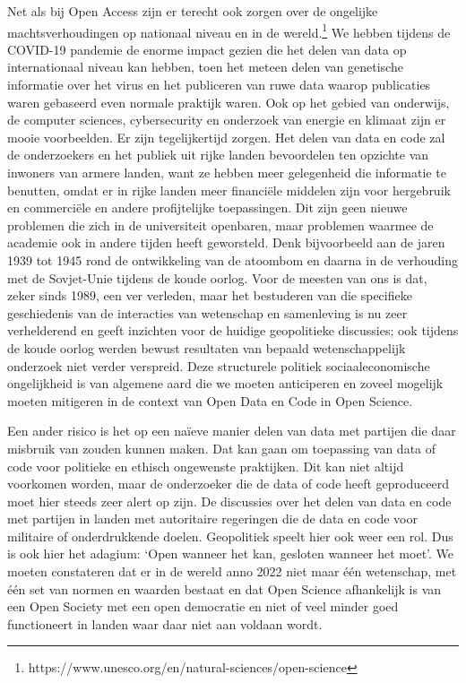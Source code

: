 \documentclass{jote-book}
\begin{document}
	Net als bij Open Access zijn er terecht ook zorgen over de ongelijke machtsverhoudingen op nationaal niveau en in de wereld.\footnote{https://www.unesco.org/en/natural-sciences/open-science} We hebben tijdens de COVID-19 pandemie de enorme impact gezien die het delen van data op internationaal niveau kan hebben, toen het meteen delen van genetische informatie over het virus en het publiceren van ruwe data waarop publicaties waren gebaseerd even normale praktijk waren. Ook op het gebied van onderwijs, de computer sciences, cybersecurity en onderzoek van energie en klimaat zijn er mooie voorbeelden. Er zijn tegelijkertijd zorgen. Het delen van data en code zal de onderzoekers en het publiek uit rijke landen bevoordelen ten opzichte van inwoners van armere landen, want ze hebben meer gelegenheid die informatie te benutten, omdat er in rijke landen meer financiële middelen zijn voor hergebruik en commerciële en andere profijtelijke toepassingen. Dit zijn geen nieuwe problemen die zich in de universiteit openbaren, maar problemen waarmee de academie ook in andere tijden heeft geworsteld. Denk bijvoorbeeld aan de jaren 1939 tot 1945 rond de ontwikkeling van de atoombom en daarna in de verhouding met de Sovjet-Unie tijdens de koude oorlog. Voor de meesten van ons is dat, zeker sinds 1989, een ver verleden, maar het bestuderen van die specifieke geschiedenis van de interacties van wetenschap en samenleving is nu zeer verhelderend en geeft inzichten voor de huidige geopolitieke discussies; ook tijdens de koude oorlog werden bewust resultaten van bepaald wetenschappelijk onderzoek niet verder verspreid. Deze structurele politiek sociaaleconomische ongelijkheid is van algemene aard die we moeten anticiperen en zoveel mogelijk moeten mitigeren in de context van Open Data en Code in Open Science.



	Een ander risico is het op een naïeve manier delen van data met partijen die daar misbruik van zouden kunnen maken. Dat kan gaan om toepassing van data of code voor politieke en ethisch ongewenste praktijken. Dit kan niet altijd voorkomen worden, maar de onderzoeker die de data of code heeft geproduceerd moet hier steeds zeer alert op zijn. De discussies over het delen van data en code met partijen in landen met autoritaire regeringen die de data en code voor militaire of onderdrukkende doelen. Geopolitiek speelt hier ook weer een rol. Dus is ook hier het adagium: ‘Open wanneer het kan, gesloten wanneer het moet'. We moeten constateren dat er in de wereld anno 2022 niet maar één wetenschap, met één set van normen en waarden bestaat en dat Open Science afhankelijk is van een Open Society met een open democratie en niet of veel minder goed functioneert in landen waar daar niet aan voldaan wordt.
\end{document}
